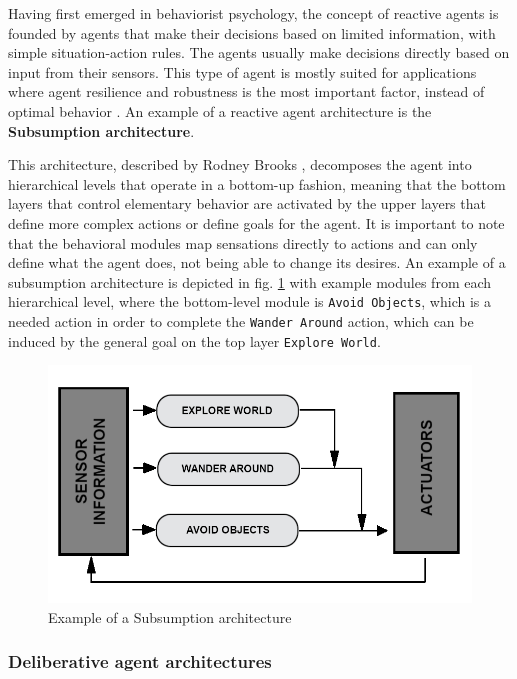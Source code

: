 \documentclass[0main.tex]{subfiles}
\begin{document}
Having first emerged in behaviorist psychology, the concept of reactive agents is founded by agents
that make their decisions based on limited information, with simple situation-action rules. The agents
usually make decisions directly based on input from their sensors. This type of agent is mostly
suited for applications where agent resilience and robustness is the most important factor, instead
of optimal behavior \cite{Anthony2014}. An example of a reactive agent architecture is the
\textbf{Subsumption architecture}.

This architecture, described by Rodney Brooks \cite{1087032},
decomposes the agent into hierarchical levels that operate in a bottom-up
fashion, meaning that the bottom layers that control elementary behavior are
activated by the upper layers that define more complex actions or define goals for
the agent. It is important to note that the behavioral modules map sensations
directly to actions and can only define what the agent does, not being able to
change its desires. An example of a subsumption architecture is depicted in fig.
\ref{Subsumption} with example modules from each hierarchical level, where the
bottom-level module is \texttt{Avoid Objects}, which is a needed action in order
to complete the \texttt{Wander Around} action, which can be induced by the
general goal on the top layer \texttt{Explore World}.

\begin{figure}[htbp]
    \centering
    \includegraphics[width = .8\textwidth]{Subsumption_Architecture_Abstract_Diagram-unified.png}
    \caption{Example of a Subsumption architecture}
    \label{Subsumption}
\end{figure}

\subsubsection{Deliberative agent architectures}
\end{document}
